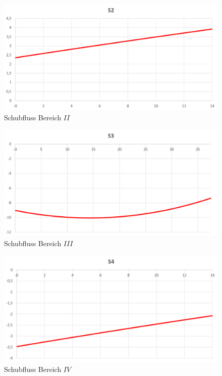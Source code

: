 \begin{figure}
	\includegraphics[width=1.0\textwidth]{Bilder/S2.png}
	\caption{Schubfluss Bereich $II$}
	\label{fig:S2}
\end{figure}
\begin{figure}
	\includegraphics[width=1.0\textwidth]{Bilder/S3.png}
	\caption{Schubfluss Bereich $III$}
	\label{fig:S3}
\end{figure}
\begin{figure}
	\includegraphics[width=1.0\textwidth]{Bilder/S4.png}
	\caption{Schubfluss Bereich $IV$}
	\label{fig:S4}
\end{figure}
